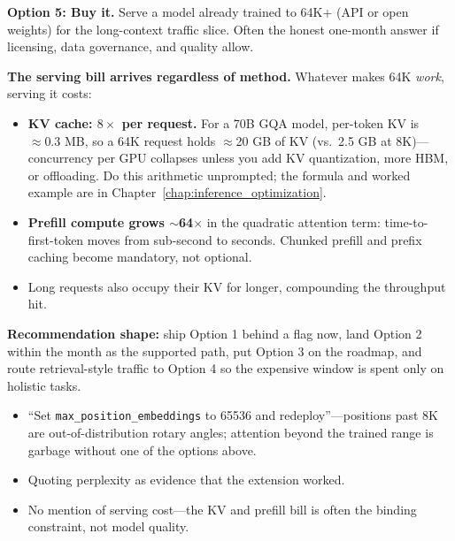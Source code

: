 \begin{interviewq}
\textbf{Option 5: Buy it.} Serve a model already trained to 64K+ (API or open weights) for the long-context traffic slice. Often the honest one-month answer if licensing, data governance, and quality allow.

\textbf{The serving bill arrives regardless of method.} Whatever makes 64K \textit{work}, serving it costs:
\begin{itemize}
    \item \textbf{KV cache: $8\times$ per request.} For a 70B GQA model, per-token KV is $\approx 0.3$ MB, so a 64K request holds $\approx$20 GB of KV (vs.\ 2.5 GB at 8K)---concurrency per GPU collapses unless you add KV quantization, more HBM, or offloading. Do this arithmetic unprompted; the formula and worked example are in Chapter~\ref{chap:inference_optimization}.
    \item \textbf{Prefill compute grows $\sim$64$\times$} in the quadratic attention term: time-to-first-token moves from sub-second to seconds. Chunked prefill and prefix caching become mandatory, not optional.
    \item Long requests also occupy their KV for longer, compounding the throughput hit.
\end{itemize}

\textbf{Recommendation shape:} ship Option 1 behind a flag now, land Option 2 within the month as the supported path, put Option 3 on the roadmap, and route retrieval-style traffic to Option 4 so the expensive window is spent only on holistic tasks.

\redflags
\begin{itemize}
    \item ``Set \texttt{max\_position\_embeddings} to 65536 and redeploy''---positions past 8K are out-of-distribution rotary angles; attention beyond the trained range is garbage without one of the options above.
    \item Quoting perplexity as evidence that the extension worked.
    \item No mention of serving cost---the KV and prefill bill is often the binding constraint, not model quality.
\end{itemize}



\end{interviewq}
